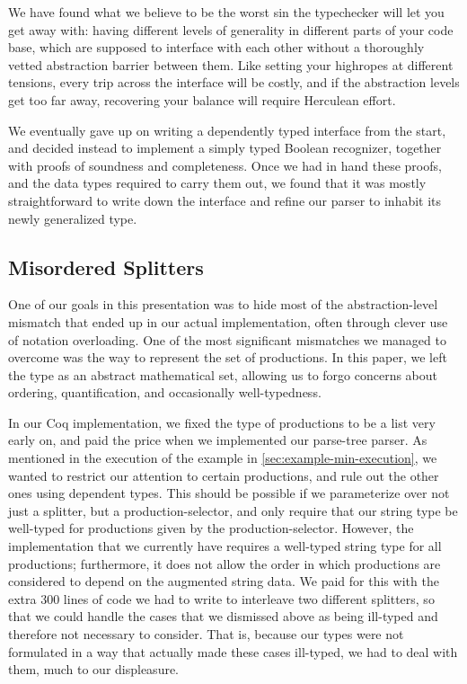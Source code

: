     We have found what we believe to be the worst sin the typechecker will let you get away with: having different levels of generality in different parts of your code base, which are supposed to interface with each other without a thoroughly vetted abstraction barrier between them.  Like setting your highropes at different tensions, every trip across the interface will be costly, and if the abstraction levels get too far away, recovering your balance will require Herculean effort.

    We eventually gave up on writing a dependently typed interface from the start, and decided instead to implement a simply typed Boolean recognizer, together with proofs of soundness and completeness.  Once we had in hand these proofs, and the data types required to carry them out, we found that it was mostly straightforward to write down the interface and refine our parser to inhabit its newly generalized type.

  \subsection{Misordered Splitters} \label{sec:misordered-splitters}
    One of our goals in this presentation was to hide most of the abstraction-level mismatch that ended up in our actual implementation, often through clever use of notation overloading.  One of the most significant mismatches we managed to overcome was the way to represent the set of productions.  In this paper, we left the type as an abstract mathematical set, allowing us to forgo concerns about ordering, quantification, and occasionally well-typedness.

    In our Coq implementation, we fixed the type of productions to be a list very early on, and paid the price when we implemented our parse-tree parser.  As mentioned in the execution of the example in \autoref{sec:example-min-execution}, we wanted to restrict our attention to certain productions, and rule out the other ones using dependent types.  This should be possible if we parameterize over not just a splitter, but a production-selector, and only require that our string type be well-typed for productions given by the production-selector.  However, the implementation that we currently have requires a well-typed string type for all productions; furthermore, it does not allow the order in which productions are considered to depend on the augmented string data.  We paid for this with the extra 300 lines of code we had to write to interleave two different splitters, so that we could handle the cases that we dismissed above as being ill-typed and therefore not necessary to consider.  That is, because our types were not formulated in a way that actually made these cases ill-typed, we had to deal with them, much to our displeasure.

